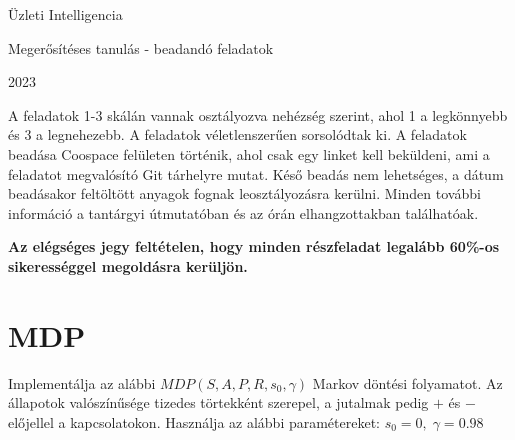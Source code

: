 \documentclass[english]{article}
\begin{document}
\begin{titlepage}
\centering

\vspace{4cm} 

\Huge

Üzleti Intelligencia

\vspace{2cm} 

\Large

Megerősítéses tanulás - beadandó feladatok

\vspace{0.5cm}

2023 %

\vspace{2cm} 

\normalsize

A feladatok 1-3 skálán vannak osztályozva nehézség szerint, ahol 1 a legkönnyebb és 3 a legnehezebb. A feladatok véletlenszerűen sorsolódtak ki. A feladatok beadása Coospace felületen történik, ahol csak egy linket kell beküldeni, ami a feladatot megvalósító Git tárhelyre mutat. Késő beadás nem lehetséges, a dátum beadásakor feltöltött anyagok fognak leosztályozásra kerülni. Minden további információ a tantárgyi útmutatóban és az órán elhangzottakban találhatóak. \par\medskip
\begin{large}
\textbf{Az elégséges jegy feltételen, hogy minden részfeladat legalább 60\%-os sikerességgel megoldásra kerüljön.}
\end{large}
\end{titlepage}

\newpage

\section{MDP}

Implementálja az alábbi $MDP(S,A,P,R,s_0,\gamma)$ Markov döntési folyamatot. Az állapotok valószínűsége tizedes törtekként szerepel, a jutalmak pedig $+$ és $-$ előjellel a kapcsolatokon. Használja az alábbi paramétereket: $s_0 = 0, \; \gamma=0.98$
\end{document}
